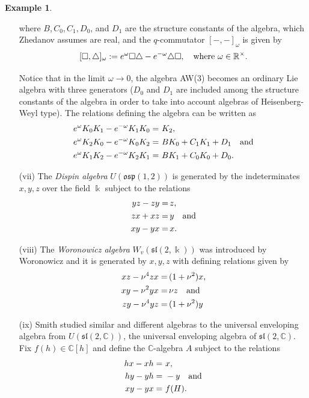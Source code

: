 \documentclass{amsart}
\theoremstyle{definition}
\newtheorem{example}[theorem]{Example}
\theoremstyle{remark}
\numberwithin{equation}{section}
\begin{document}
\begin{example}
\begin{enumerate}
where $B, C_0, C_1, D_0$, and $D_1$ are the structure constants of the algebra, which Zhedanov assumes are real, and the $q$-commutator $[ - , -]_{\omega}$ is given by 
$$
[\square, \triangle]_{\omega}:= e^{\omega}\square \triangle - e^{- \omega}\triangle \square, \quad {\rm where} \, \, \omega\in \mathbb{R}^{\times}.
$$ 

Notice that in the limit $\omega \to 0$, the algebra AW(3) becomes an ordinary Lie algebra with three generators ($D_0$ and $D_1$ are included among the structure constants of the algebra in order to take into account algebras of Heisenberg-Weyl type). The relations defining the algebra can be written as 
\begin{align*}
    e^{\omega}K_0K_1 - e^{-\omega}K_1K_0 = &\ K_2,\\
    e^{\omega} K_2K_0 - e^{-\omega}K_0 K_2 = &\ BK_0 + C_1K_1 + D_1 \quad {\rm and} \\
    e^{\omega}K_1K_2 - e^{-\omega}K_2K_1 = &\ BK_1 + C_0K_0 + D_0.
\end{align*}

\item [\rm (vii)] The {\em Dispin algebra} $U({\mathfrak{osp}}(1,2))$ is generated by the indeterminates $x, y, z$ over the field $\Bbbk$ subject to the relations
\begin{align*}
yz - zy = &\, z, \\
zx + xz = &\, y \quad {\rm and} \\
xy - yx = &\, x. 
\end{align*}

\item [\rm (viii)] The {\em Woronowicz algebra} $W_v(\mathfrak{sl}(2,\Bbbk))$ was introduced by Woronowicz \cite{Woronowicz1987} and it is generated by $x, y, z$ with defining relations given by
\begin{align*}
xz - \nu^{4}zx = &\, (1 + \nu^2)x,  \\
xy - \nu^{2}yx = &\, \nu z \quad {\rm and} \\
zy - \nu^{4}yz = &\, (1 + \nu^{2})y
\end{align*}

\item [\rm (ix)] Smith \cite{Smith1990} studied similar and different algebras to the universal enveloping algebra from $U(\mathfrak{sl}(2, \mathbb{C}))$, the universal enveloping algebra of $\mathfrak{sl}(2, \mathbb{C})$. Fix $f(h)\in \mathbb{C}[h]$ and define the $\mathbb{C}$-algebra $A$ subject to the relations
\begin{align*}
hx - xh = &\ x, \\
hy - yh = &\ -y \quad {\rm and} \\
xy - yx = &\ f(H).
\end{align*}


\end{enumerate}
\end{example}
\end{document}
